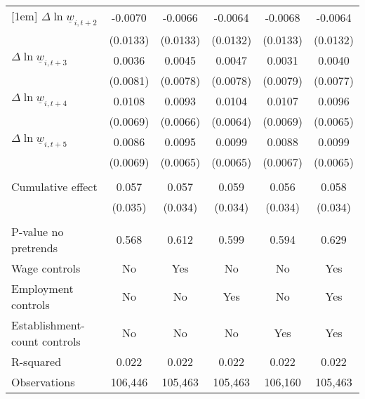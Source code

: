 {\begin{tabular}{l*{5}{c}}
[1em]
$\Delta \ln \underline{w}_{i,t+2}$&  -0.0070         &  -0.0066         &  -0.0064         &  -0.0068         &  -0.0064         \\
          & (0.0133)         & (0.0133)         & (0.0132)         & (0.0133)         & (0.0132)         \\
[1em]
$\Delta \ln \underline{w}_{i,t+3}$&   0.0036         &   0.0045         &   0.0047         &   0.0031         &   0.0040         \\
          & (0.0081)         & (0.0078)         & (0.0078)         & (0.0079)         & (0.0077)         \\
[1em]
$\Delta \ln \underline{w}_{i,t+4}$&   0.0108         &   0.0093         &   0.0104         &   0.0107         &   0.0096         \\
          & (0.0069)         & (0.0066)         & (0.0064)         & (0.0069)         & (0.0065)         \\
[1em]
$\Delta \ln \underline{w}_{i,t+5}$&   0.0086         &   0.0095         &   0.0099         &   0.0088         &   0.0099         \\
          & (0.0069)         & (0.0065)         & (0.0065)         & (0.0067)         & (0.0065)         \\
\hline
\vspace{-2mm}&                  &                  &                  &                  &                  \\
Cumulative effect&    0.057         &0.057\sym{*}         &0.059\sym{*}         &    0.056         &0.058\sym{*}         \\
          &  (0.035)         &  (0.034)         &  (0.034)         &  (0.034)         &  (0.034)         \\
\hline    &                  &                  &                  &                  &                  \\
P-value no pretrends&    0.568         &    0.612         &    0.599         &    0.594         &    0.629         \\
Wage controls&       No         &      Yes         &       No         &       No         &      Yes         \\
Employment controls&       No         &       No         &      Yes         &       No         &      Yes         \\
Establishment-count controls&       No         &       No         &       No         &      Yes         &      Yes         \\
R-squared &    0.022         &    0.022         &    0.022         &    0.022         &    0.022         \\
Observations&  106,446         &  105,463         &  105,463         &  106,160         &  105,463         \\
\hline\hline
\end{tabular}
}
